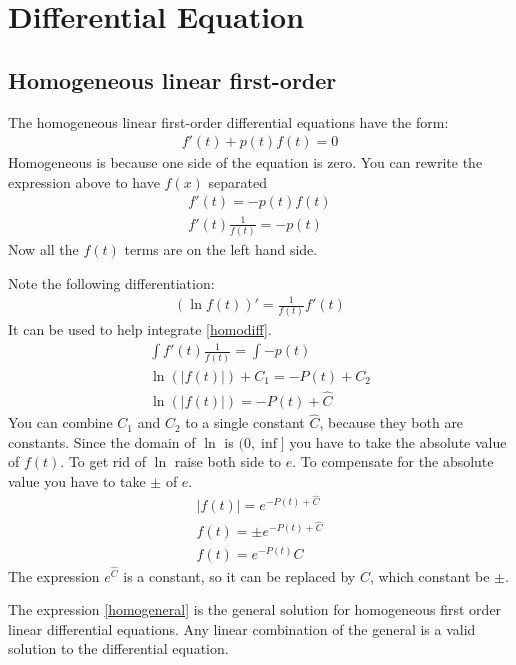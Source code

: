 \chapter{Differential Equation}
\section{Homogeneous linear first-order}
The homogeneous linear first-order differential equations have the form:
\begin{align*}
   f'(t) + p(t)f(t) = 0
\end{align*}
Homogeneous is because one side of the equation is zero. 
You can rewrite the expression above to have \(f(x)\) separated
\begin{gather}
   f'(t)  = -p(t)f(t) \\
f'(t) \frac{1}{f(t)} = -p(t) \label{homodiff}
\end{gather}
Now all the \(f(t)\) terms are on the left hand side.

Note the following differentiation:
\begin{gather}
    (\ln f(t))' = \frac{1}{f(t)} f'(t)
\end{gather}
It can be used to help integrate \ref{homodiff}.
\begin{gather*}
\int f'(t) \frac{1}{f(t)} = \int -p(t) \\
\ln(|f(t)|) + C_1  =- P(t) + C_2 \\
\ln(|f(t)|)  = -P(t) + \hat{C}
\end{gather*}
You can combine \(C_1\) and \(C_2\) to a single constant \(\hat{C}\), because they
both are constants. 
Since the domain of \( \ln \) is \((0, \inf]\) you have to take the absolute value of \(f(t)\).
To get rid of \(\ln\) raise both side to \( e \). To compensate for the absolute value
you have to take \(\pm\) of \(e\).
\begin{gather}
   |f(t)| = e^{-P(t) + \hat{C}} \\
   f(t) = \pm e^{-P(t) + \hat{C}} \\
   f(t) =  e^{-P(t)} C \label{homogeneral}
\end{gather} 
The expression \(e^{\hat{C}}\) is a constant, so it can be replaced by \(C\), which constant
be \(\pm\). 

The expression \ref{homogeneral} is the general solution for homogeneous first order
linear differential equations. Any linear combination of the general is a valid solution 
to the differential equation.
